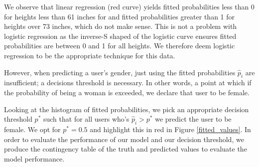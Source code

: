\documentclass{article}\usepackage[]{graphicx}\usepackage[]{color}
\begin{document}
We observe that linear regression (red curve) yields fitted probabilities less than 0 for heights less than 61 inches for and fitted probabilities greater than 1 for heights over 73 inches, which do not make sense.  This is not a problem with logistic regression as the inverse-S shaped of the logistic curve ensures fitted probabilities are between 0 and 1 for all heights.   We therefore deem logistic regression to be the appropriate technique for this data.

However, when predicting a user's gender, just using the fitted probabilities $\widehat{p}_i$ are insufficient; a decisions threshold is necessary.  In other words, a point at which if the probability of being a woman is exceeded, we declare that user to be female.

Looking at the histogram of fitted probabilities, we pick an appropriate decision threshold $p^*$ such that for all users who's $\widehat{p}_i > p^*$ we predict the user to be female.  We opt for $p^* = 0.5$ and highlight this in red in Figure \ref{fitted_values}.  In order to evaluate the performance of our model and our decision threshold, we produce the contingency table of the truth and predicted values to evaluate the model performance.
\end{document}
